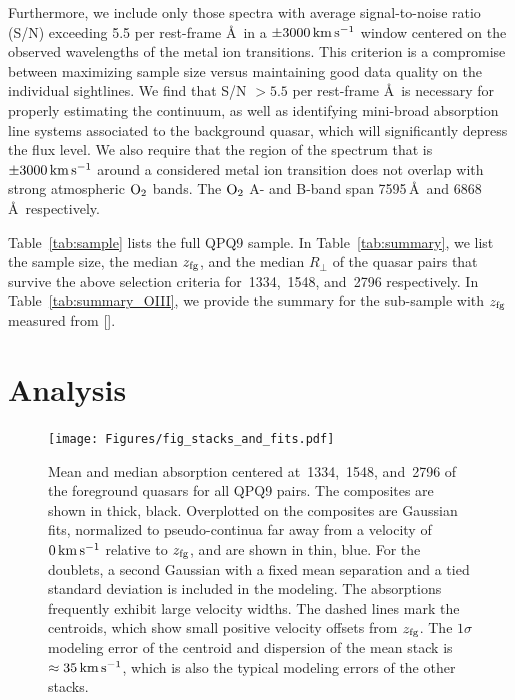 \documentclass[iop]{emulateapj}
\begin{document}
Furthermore, we include only those spectra with average signal-to-noise ratio (S/N) exceeding 5.5 
per rest-frame \AA \ in a $\pm3000\,{\rm km\,s^{-1}}$ window centered on the observed wavelengths 
of the metal ion transitions. This criterion is a compromise between maximizing sample size versus 
maintaining good data quality on the individual sightlines. We find that S/N $>5.5$ per rest-frame 
\AA \ is 
necessary for properly estimating the continuum, as well as identifying mini-broad absorption line 
systems associated to the background quasar, which will significantly depress the flux level. We 
also require that the region of the spectrum that is $\pm3000\,{\rm km\,s^{-1}}$ around a 
considered metal ion transition does not overlap with strong atmospheric ${\rm O}_2$ bands. 
The ${\rm O}_2$ A- and B-band span 7595\,\AA \ and 6868\,\AA \ 
respectively. 

Table~\ref{tab:sample} lists the full QPQ9 sample. 
In Table~\ref{tab:summary}, we list the sample size, the median $z_{\rm fg}$, and the median 
$R_\perp$ of the quasar pairs that survive the above selection criteria for \ion{C}{2}\,1334, 
\ion{C}{4}\,1548, and \ion{Mg}{2}\,2796 respectively. In Table~\ref{tab:summary_OIII}, we provide 
the summary for the sub-sample with $z_{\rm fg}$ measured from [\ion{O}{3}]. 

\section{Analysis}
\label{sec:analysis}

\begin{figure}
\texttt{[image: Figures/fig\_stacks\_and\_fits.pdf]}
\caption{Mean and median absorption centered at \,1334, \,1548, and 
\ion{Mg}{2}\,2796 of the foreground quasars for all QPQ9 pairs. The composites are shown in thick, 
black. Overplotted on the composites are Gaussian fits, normalized to pseudo-continua far away 
from a velocity of $0\,{\rm km\,s^{-1}}$ relative to $z_{\rm fg}$, and are shown in thin, blue. 
For the doublets, a second Gaussian with a fixed mean separation and a tied standard deviation is 
included in the modeling. The absorptions frequently exhibit large velocity widths. The dashed 
lines mark the centroids, which show small positive velocity offsets from $z_{\rm fg}$. The 
$1\sigma$ modeling error of the centroid and dispersion of the \ion{C}{2} mean stack is 
$\approx35\,{\rm km\,s^{-1}}$, which is also the typical modeling errors of the other stacks. 
}
\label{fig:stacks_and_fits}
\end{figure}
\end{document}
